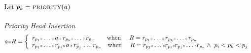 \noindent
$\text{Let }p_k = \text{\scshape priority}(a) $\\
\\
\hspace{-7mm} \emph{Priority Head Insertion} \\
\begin{equation}
\label{pri_hd_ins}
  a \smodot R = \left \{
    \begin{array}{l}
      r_{p_1}\smcirc\ldots\smcirc\,a\,\smcirc\,r_{p_k}\smcirc\ldots\smcirc\,r_{p_n} 
      \ \ \ \ \ \ \text{when}\ \ \ \ 
      R=r_{p_1}\smcirc\ldots\smcirc\,r_{p_k}\smcirc\ldots\smcirc\,r_{p_n}  \\ 
      r_{p_1}\smcirc\ldots\smcirc\,r_{p_i}\smcirc\,a\,\smcirc\,r_{p_j}\,\ldots\,r_{p_n}
      \ \ \ \text{when} \  \ \ \ 
      R = r_{p_1}\smcirc\ldots\smcirc r_{p_i}\smcirc
      r_{p_j}\smcirc\ldots\smcirc r_{p_n} \wedge \  p_i < p_k < p_j 
    \end{array} 
  \right.
\end{equation}



